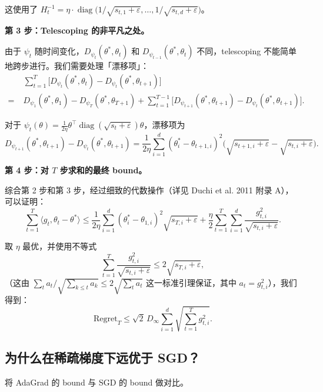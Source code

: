 \documentclass[12pt,a4paper]{ctexart}
\theoremstyle{definition}
\theoremstyle{plain}
\theoremstyle{remark}
\newcommand{\diag}{\operatorname{diag}}
\newcommand{\Regret}{\mathrm{Regret}}
\begin{document}
这使用了 $H_t^{-1} = \eta \cdot \diag\big(1/\sqrt{s_{t,1}+\varepsilon}, \dots, 1/\sqrt{s_{t,d}+\varepsilon}\big)$。

\textbf{第 3 步：Telescoping 的非平凡之处。}

由于 $\psi_t$ 随时间变化，$D_{\psi_t}(\theta^*, \theta_t)$ 和 $D_{\psi_{t-1}}(\theta^*, \theta_t)$ 不同，telescoping 不能简单地跨步进行。我们需要处理「漂移项」：
\begin{align*}
  &\sum_{t=1}^{T} \big[ D_{\psi_t}(\theta^*, \theta_t) - D_{\psi_t}(\theta^*, \theta_{t+1}) \big] \\
  =\;& D_{\psi_1}(\theta^*, \theta_1) - D_{\psi_T}(\theta^*, \theta_{T+1})
    + \sum_{t=1}^{T-1} \big[ D_{\psi_{t+1}}(\theta^*, \theta_{t+1}) - D_{\psi_t}(\theta^*, \theta_{t+1}) \big].
\end{align*}

对于 $\psi_t(\theta) = \frac{1}{2\eta}\theta^\top \diag(\sqrt{s_t + \varepsilon})\theta$，漂移项为
\[
  D_{\psi_{t+1}}(\theta^*, \theta_{t+1}) - D_{\psi_t}(\theta^*, \theta_{t+1})
  = \frac{1}{2\eta}\sum_{i=1}^{d}
    (\theta_i^* - \theta_{t+1,i})^2
    \big( \sqrt{s_{t+1,i}+\varepsilon} - \sqrt{s_{t,i}+\varepsilon} \big).
\]

\textbf{第 4 步：对 $T$ 步求和的最终 bound。}

综合第 2 步和第 3 步，经过细致的代数操作（详见 Duchi et al. 2011 附录 A），可以证明：
\[
  \sum_{t=1}^{T} \langle g_t, \theta_t - \theta^*\rangle
  \le \frac{1}{2\eta} \sum_{i=1}^{d} (\theta_i^* - \theta_{1,i})^2 \sqrt{s_{T,i} + \varepsilon}
     + \frac{\eta}{2} \sum_{t=1}^{T} \sum_{i=1}^{d} \frac{g_{t,i}^2}{\sqrt{s_{t,i}+\varepsilon}}.
\]

取 $\eta$ 最优，并使用不等式
\[
  \sum_{t=1}^{T} \frac{g_{t,i}^2}{\sqrt{s_{t,i} + \varepsilon}}
  \le 2\sqrt{s_{T,i} + \varepsilon},
\]
（这由 $\sum_t a_t / \sqrt{\sum_{k\le t} a_k} \le 2\sqrt{\sum_t a_t}$ 这一标准引理保证，其中 $a_t = g_{t,i}^2$），我们得到：
\[
  \Regret_T \le \sqrt{2}\, D_\infty \sum_{i=1}^{d} \sqrt{\sum_{t=1}^{T} g_{t,i}^2}.
\]

\subsection{为什么在稀疏梯度下远优于 SGD？}

将 AdaGrad 的 bound 与 SGD 的 bound 做对比。
\end{document}

